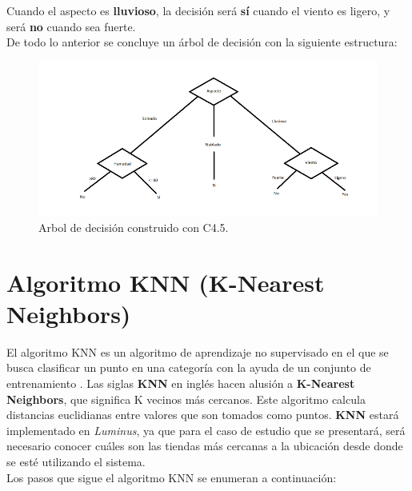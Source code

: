 \begin{UClist}
	Cuando el aspecto es \textbf{lluvioso}, la decisión será \textbf{sí} cuando el viento es ligero, y será \textbf{no} cuando sea fuerte.\\

	\UCli De todo lo anterior se concluye un árbol de decisión con la siguiente estructura:\\

	\begin{figure}[H]
		\hypertarget{fig:arbol-final-c45}{\hspace{1pt}}
		\begin{center}
			\includegraphics{capitulo2/images/arbol-final-c45.png}
			\caption{Arbol de decisión construido con C4.5.}
			\label{fig:arbol-final-c45}
		\end{center}
	\end{figure}

\end{UClist}

\newpage
\section{Algoritmo KNN (K-Nearest Neighbors)}

El algoritmo KNN es un algoritmo de aprendizaje no supervisado en el que se busca clasificar un punto en una categoría con la ayuda de un conjunto de entrenamiento \cite{KNN}. Las siglas \textbf{KNN} en inglés hacen alusión a \textbf{K-Nearest Neighbors}, que significa K vecinos más cercanos. Este algoritmo calcula distancias euclidianas entre valores que son tomados como puntos. \textbf{KNN} estará implementado en \emph{Luminus}, ya que para el caso de estudio que se presentará, será necesario conocer cuáles son las tiendas más cercanas a la ubicación desde donde se esté utilizando el sistema.\\

Los pasos que sigue el algoritmo KNN se enumeran a continuación:\\


